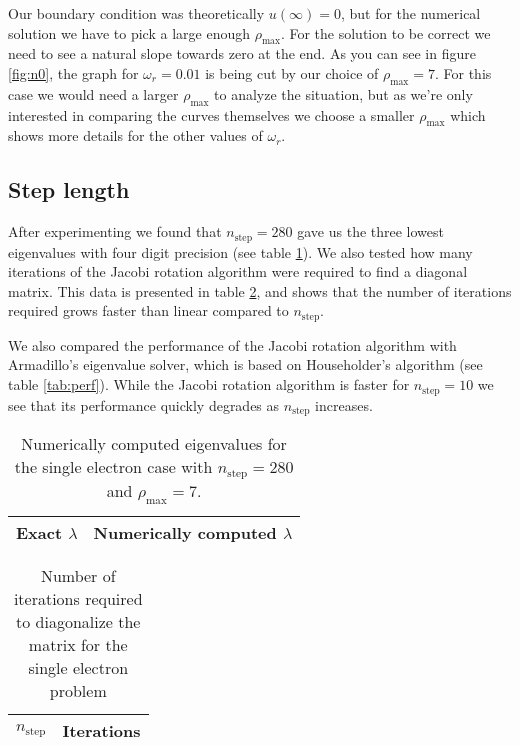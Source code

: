 \documentclass[a4paper]{revtex4}
\begin{document}
Our boundary condition was theoretically $u(\infty) = 0$, but for the
numerical solution we have to pick a large enough $\rho_\text{max}$. For the
solution to be correct we need to see a natural slope towards zero at the end.
As you can see in figure \ref{fig:n0}, the graph for $\omega_r = 0.01$ is
being cut by our choice of $\rho_\text{max} = 7$. For this case we would need
a larger $\rho_\text{max}$ to analyze the situation, but as we're only
interested in comparing the curves themselves we choose a smaller
$\rho_\text{max}$ which shows more details for the other values of
$\omega_r$. 

\subsection{Step length}

After experimenting we found that $n_\text{step} = 280$ gave us the three
lowest eigenvalues with four digit precision (see table \ref{tab:step}). We
also tested how many iterations of the Jacobi rotation algorithm were required
to find a diagonal matrix. This data is presented in table \ref{tab:prec}, and
shows that the number of iterations required grows faster than linear compared
to $n_\text{step}$.

We also compared the performance of the Jacobi rotation algorithm with
Armadillo's eigenvalue solver, which is based on Householder's algorithm (see
table \ref{tab:perf}). While the Jacobi rotation algorithm is faster for
$n_\text{step} = 10$ we see that its performance quickly degrades as
$n_\text{step}$ increases.

\begin{table}
  \begin{tabular}{|r|r|}
    \hline
    Exact $\lambda$ & Numerically computed $\lambda$ \\
    \hline
    
    \hline
  \end{tabular}
  \caption{Numerically computed eigenvalues for the single electron case with
  $n_\text{step} = 280$ and $\rho_\text{max} = 7$.}
  \label{tab:step}
\end{table}

\begin{table}
  \begin{tabular}{|r|r|}
    \hline
    $n_\text{step}$ & Iterations \\
    \hline
    
    \hline
  \end{tabular}
  \caption{Number of iterations required to diagonalize the matrix for the
  single electron problem}
  \label{tab:prec}
\end{table}
\end{document}
